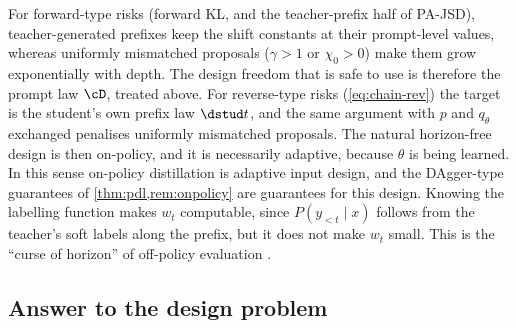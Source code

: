 \begin{remark}\label{rem:path-design}
For forward-type risks (forward KL, and the teacher-prefix half of PA-JSD), teacher-generated prefixes
keep the shift constants at their prompt-level values, whereas uniformly mismatched proposals
($\gamma>1$ or $\chi_0>0$) make them grow exponentially with depth. The design freedom that is safe to use is
therefore the prompt law $\cD$, treated above. For reverse-type risks (\cref{eq:chain-rev}) the target is the
student's own prefix law $\dstud t$, and the same argument with $p$ and $q_\theta$ exchanged penalises uniformly
mismatched proposals. The natural horizon-free design is then on-policy, and it is necessarily
adaptive, because $\theta$ is being learned. In this sense on-policy distillation is adaptive input design,
and the DAgger-type guarantees of \cref{thm:pdl,rem:onpolicy} are guarantees for this design. Knowing the
labelling function makes $w_t$ computable, since $P(y_{<t}\mid x)$ follows from the teacher's soft labels
along the prefix, but it does not make $w_t$ small. This is the ``curse of horizon'' of off-policy
evaluation \citep{liu2018breaking}.
\end{remark}

\subsection{Answer to the design problem}\label{sec:design-answer}

